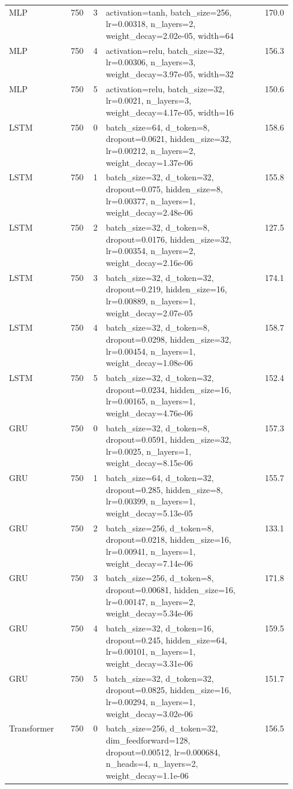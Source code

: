 \begin{longtable}{lrrp{0.55\linewidth}r}
MLP & 750 & 3 & activation=tanh, batch\_size=256, lr=0.00318, n\_layers=2, weight\_decay=2.02e-05, width=64 & 170.0 \\
MLP & 750 & 4 & activation=relu, batch\_size=32, lr=0.00306, n\_layers=3, weight\_decay=3.97e-05, width=32 & 156.3 \\
MLP & 750 & 5 & activation=relu, batch\_size=32, lr=0.0021, n\_layers=3, weight\_decay=4.17e-05, width=16 & 150.6 \\
LSTM & 750 & 0 & batch\_size=64, d\_token=8, dropout=0.0621, hidden\_size=32, lr=0.00212, n\_layers=2, weight\_decay=1.37e-06 & 158.6 \\
LSTM & 750 & 1 & batch\_size=32, d\_token=32, dropout=0.075, hidden\_size=8, lr=0.00377, n\_layers=1, weight\_decay=2.48e-06 & 155.8 \\
LSTM & 750 & 2 & batch\_size=32, d\_token=8, dropout=0.0176, hidden\_size=32, lr=0.00354, n\_layers=2, weight\_decay=2.16e-06 & 127.5 \\
LSTM & 750 & 3 & batch\_size=32, d\_token=32, dropout=0.219, hidden\_size=16, lr=0.00889, n\_layers=1, weight\_decay=2.07e-05 & 174.1 \\
LSTM & 750 & 4 & batch\_size=32, d\_token=8, dropout=0.0298, hidden\_size=32, lr=0.00454, n\_layers=1, weight\_decay=1.08e-06 & 158.7 \\
LSTM & 750 & 5 & batch\_size=32, d\_token=32, dropout=0.0234, hidden\_size=16, lr=0.00165, n\_layers=1, weight\_decay=4.76e-06 & 152.4 \\
GRU & 750 & 0 & batch\_size=32, d\_token=8, dropout=0.0591, hidden\_size=32, lr=0.0025, n\_layers=1, weight\_decay=8.15e-06 & 157.3 \\
GRU & 750 & 1 & batch\_size=64, d\_token=32, dropout=0.285, hidden\_size=8, lr=0.00399, n\_layers=1, weight\_decay=5.13e-05 & 155.7 \\
GRU & 750 & 2 & batch\_size=256, d\_token=8, dropout=0.0218, hidden\_size=16, lr=0.00941, n\_layers=1, weight\_decay=7.14e-06 & 133.1 \\
GRU & 750 & 3 & batch\_size=256, d\_token=8, dropout=0.00681, hidden\_size=16, lr=0.00147, n\_layers=2, weight\_decay=5.34e-06 & 171.8 \\
GRU & 750 & 4 & batch\_size=32, d\_token=16, dropout=0.245, hidden\_size=64, lr=0.00101, n\_layers=1, weight\_decay=3.31e-06 & 159.5 \\
GRU & 750 & 5 & batch\_size=32, d\_token=32, dropout=0.0825, hidden\_size=16, lr=0.00294, n\_layers=1, weight\_decay=3.02e-06 & 151.7 \\
Transformer & 750 & 0 & batch\_size=256, d\_token=32, dim\_feedforward=128, dropout=0.00512, lr=0.000684, n\_heads=4, n\_layers=2, weight\_decay=1.1e-06 & 156.5 \\

\end{longtable}
